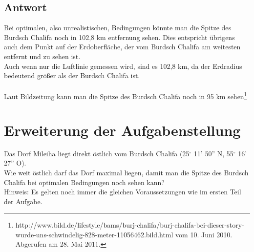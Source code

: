 \documentclass[a4paper,9pt]{scrartcl}
\begin{document}
    \subsection{Antwort}
        Bei optimalen, also unrealistischen, Bedingungen könnte man die Spitze
        des Burdsch Chalifa noch in 102,8 km entfernung sehen. Dies entspricht
        übrigens auch dem Punkt auf der Erdoberfläche, der vom Burdsch Chalifa
        am weitesten entfernt und zu sehen ist.\\
        Auch wenn nur die Luftlinie gemessen wird, sind es 102,8 km, da der
        Erdradius bedeutend größer als der Burdsch Chalifa ist.\\
        \\
        Laut Bildzeitung kann man die Spitze des Burdsch Chalifa noch in 95 km
        sehen\footnote{http://www.bild.de/lifestyle/bams/burj-chalifa/burj-chalifa-bei-dieser-story-wurde-uns-schwindelig-828-meter-11056462.bild.html vom 10. Juni 2010. Abgerufen am 28. Mai 2011.}

 \section{Erweiterung der Aufgabenstellung}
    Das Dorf Mileiha liegt direkt östlich vom Burdsch Chalifa
    (25$^\circ$ 11' 50'' N, 55$^\circ$ 16' 27'' O). \\
    Wie weit östlich darf das Dorf maximal liegen, damit man die Spitze des
    Burdsch Chalifa bei optimalen Bedingungen noch sehen kann?\\
    Hinweis: Es gelten noch immer die gleichen Voraussetzungen wie im ersten
    Teil der Aufgabe.
\end{document}
